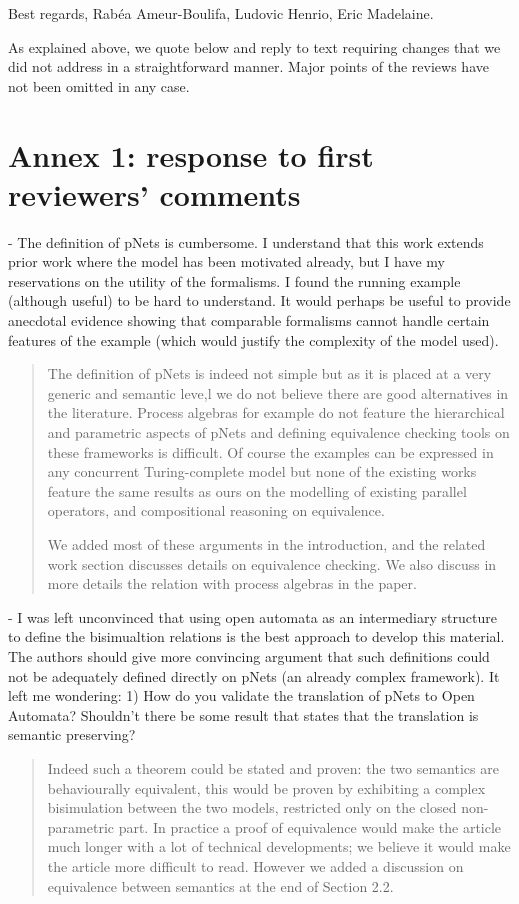 \documentclass{article}
\begin{document}
\bigskip
\noindent
Best regards,
\newline
\noindent
Rab\'ea Ameur-Boulifa, Ludovic Henrio, Eric Madelaine.

\newpage
As explained above, we quote below and reply to text requiring changes that we did not 
address in a straightforward manner. Major points of the reviews have not been omitted in 
any case.

\section*{Annex 1: response to first reviewers' comments}

- The definition of pNets is cumbersome. I understand that this work extends prior work where the model has been motivated already, but I have my reservations on the utility of the formalisms.    I found the running example (although useful) to be hard to understand.  It would perhaps be useful to provide anecdotal evidence showing that comparable formalisms cannot handle certain features of the example (which would justify the complexity of the model used).
\begin{quote}
The definition of pNets is indeed not simple but as it is placed at a very generic and semantic leve,l we do not believe there are good alternatives in the literature. Process algebras for example do not feature the hierarchical and parametric aspects of pNets and defining equivalence checking tools on these frameworks is difficult. Of course the examples can be expressed in any concurrent Turing-complete model but none of the existing works feature the same results as ours on the modelling of existing parallel operators, and compositional reasoning on equivalence.

We added most of these arguments in the introduction, and the related work section discusses details on equivalence checking. We also discuss in more details the relation with process algebras in the paper.
\end{quote}

- I was left unconvinced that using open automata as an intermediary structure to define the bisimualtion relations is the best approach to develop this material.  The authors should give more convincing argument that such definitions could not be adequately defined directly on pNets (an already complex framework).  It left me wondering:
1) How do you validate the translation of pNets to Open Automata?  Shouldn't there be some result that states that the translation is semantic preserving?   
\begin{quote}
Indeed such a theorem could be stated and proven: the two semantics are behaviourally equivalent, this would be proven by exhibiting a complex bisimulation between the two models, restricted only on the closed non-parametric part. In practice a proof of equivalence would make the article much longer with a lot of technical developments; we believe it would make the article more difficult to read. However we added a discussion on equivalence between semantics at the end of Section 2.2.
\end{quote}
 
\end{document}
